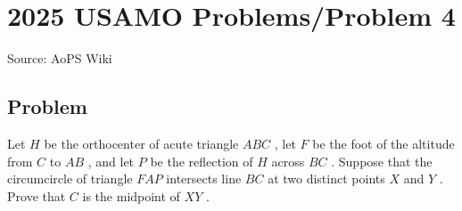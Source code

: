 \documentclass[12pt]{article}
\begin{document}
\section*{{2025 USAMO Problems/Problem 4}}
Source: AoPS Wiki

\subsection*{Problem}
Let $H$ be the orthocenter of acute triangle $ABC$ , let $F$ be the foot of the altitude from $C$ to $AB$ , and let $P$ be the reflection of $H$ across $BC$ . Suppose that the circumcircle of triangle $FAP$ intersects line $BC$ at two distinct points $X$ and $Y$ . Prove that $C$ is the midpoint of $XY$ .
\end{document}
